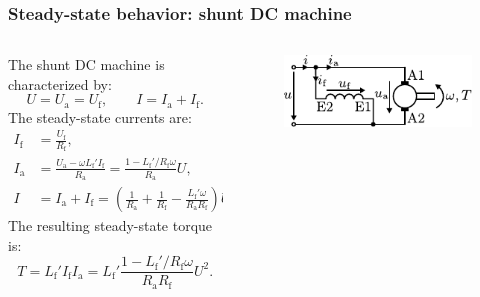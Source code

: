 \begin{frame}
	\frametitle{Steady-state behavior: shunt DC machine}
	\begin{columns}
		\begin{column}{0.55\textwidth}
		The shunt DC machine is characterized by:
	   \begin{equation}
		U = U_\mathrm{a}= U_\mathrm{f}, \qquad I = I_\mathrm{a} + I_\mathrm{f}.
	   \end{equation}
	   The steady-state currents are:
	   \begin{equation}
		\begin{split}
			I_\mathrm{f} &= \frac{U_\mathrm{f}}{R_\mathrm{f}},\\
			I_\mathrm{a} &= \frac{U_\mathrm{a} - \omega L_\mathrm{f}'I_\mathrm{f}}{R_\mathrm{a}} = \frac{1- L_\mathrm{f}'/R_\mathrm{f}\omega }{R_\mathrm{a}} U,\\
			I &= I_\mathrm{a} + I_\mathrm{f} = \left(\frac{1}{R_\mathrm{a}} + \frac{1}{R_\mathrm{f}} - \frac{L_\mathrm{f}'\omega}{R_\mathrm{a}R_\mathrm{f}}\right)U.
		\end{split}
		\end{equation}
		The resulting steady-state torque is:
		\begin{equation}
			T = L_\mathrm{f}' I_\mathrm{f} I_\mathrm{a} = L_\mathrm{f}'\frac{1- L_\mathrm{f}'/R_\mathrm{f}\omega }{R_\mathrm{a}R_\mathrm{f}}U^2.
		\end{equation}
\end{column}
\hfill
\begin{column}{0.45\textwidth}
	\begin{figure}
		\centering
		\includegraphics[scale=1.25]{fig/lec03/Shunt_DC_machine.pdf}
	\end{figure}
\end{column}
\end{columns}
\end{frame}

